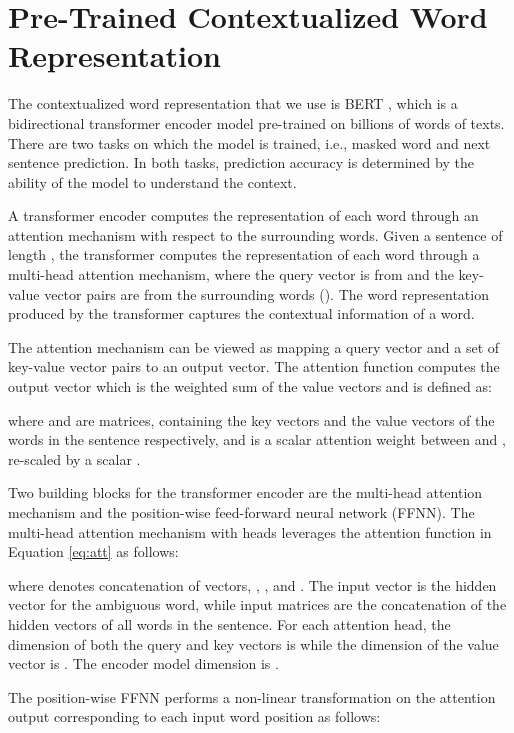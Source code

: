 \documentclass[11pt,a4paper]{article}
\begin{document}
\section{Pre-Trained Contextualized Word Representation}
\label{sec:pretrain}

The contextualized word representation that we use is BERT \cite{devlin_bert:_2019}, which is a bidirectional transformer encoder model \cite{vaswani_attention_2017} pre-trained on billions of words of texts. There are two tasks on which the model is trained, i.e., masked word and next sentence prediction. In both tasks, prediction accuracy is determined by the ability of the model to understand the context.

A transformer encoder computes the representation of each word through an attention mechanism with respect to the surrounding words. Given a sentence  of length , the transformer computes the representation of each word  through a multi-head attention mechanism, where the query vector is from  and the key-value vector pairs are from the surrounding words  (). The word representation produced by the transformer captures the contextual information of a word.

The attention mechanism can be viewed as mapping a query vector  and a set of key-value vector pairs  to an output vector. The attention function  computes the output vector which is the weighted sum of the value vectors and is defined as:

where  and  are matrices, containing the key vectors and the value vectors of the words in the sentence respectively, and  is a scalar attention weight between  and , re-scaled by a scalar .

Two building blocks for the transformer encoder are the multi-head attention mechanism and the position-wise feed-forward neural network (FFNN). The multi-head attention mechanism with  heads leverages the attention function in Equation \ref{eq:att} as follows:

where  denotes concatenation of vectors, , , and . The input vector  is the hidden vector for the ambiguous word, while input matrices  are the concatenation of the hidden vectors of all words in the sentence. For each attention head, the dimension of both the query and key vectors is  while the dimension of the value vector is . The encoder model dimension is .

The position-wise FFNN performs a non-linear transformation on the attention output corresponding to each input word position as follows:
\end{document}
